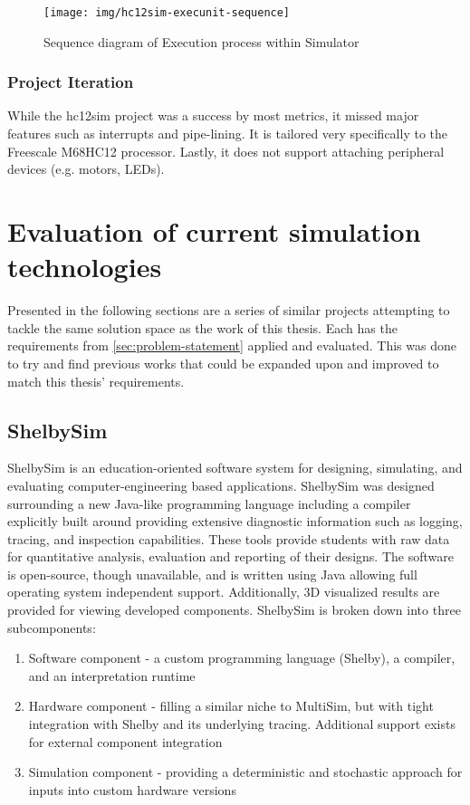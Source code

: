 \begin{figure}[!ph]
    \centering
    \texttt{[image: img/hc12sim-execunit-sequence]}
    \caption{Sequence diagram of Execution process within Simulator}
    \label{fig:hc12sim-execunit-sequence}
\end{figure} 

\subsubsection*{Project Iteration}

While the hc12sim project was a success by most metrics, it missed major features such as interrupts and pipe-lining. It is tailored very specifically to the Freescale M68HC12 processor. Lastly, it does not support attaching peripheral devices (e.g. motors, LEDs). 


\section{Evaluation of current simulation technologies} 
\label{sec:simulator-survey}

Presented in the following sections are a series of similar projects attempting to tackle the same solution space as the work of this thesis. Each has the requirements from \cref{sec:problem-statement} applied and evaluated. This was done to try and find previous works that could be expanded upon and improved to match this thesis' requirements. 

\subsection{ShelbySim}

ShelbySim is an education-oriented software system for designing, simulating, and evaluating computer-engineering based applications\cite{Tappan2009, Tappan2009-2}. ShelbySim was designed surrounding a new Java-like programming language including a compiler explicitly built around providing extensive diagnostic information such as logging, tracing, and inspection capabilities. These tools provide students with raw data for quantitative analysis, evaluation and reporting of their designs. The software is open-source, though unavailable, and is written using Java allowing full operating system independent support. Additionally, 3D visualized results are provided for viewing developed components. ShelbySim is broken down into three subcomponents:
\begin{enumerate}
    \item Software component - a custom programming language (Shelby), a compiler, and an interpretation runtime
    \item Hardware component - filling a similar niche to MultiSim, but with tight integration with Shelby and its underlying tracing. Additional support exists for external component integration
    \item Simulation component - providing a deterministic and stochastic approach for inputs into custom hardware versions
\end{enumerate} 

